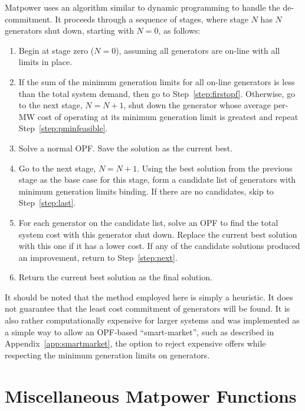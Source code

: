 \documentclass[12pt]{article}
\newcommand{\matpower}[0]{{\sc Matpower}}
\numberwithin{equation}{section}
\numberwithin{table}{section}
\numberwithin{figure}{section}
\begin{document}
\matpower{} uses an algorithm similar to dynamic programming to handle the de-commitment. It proceeds through a sequence of stages, where stage $N$ has $N$ generators shut down, starting with $N = 0$, as follows:
\begin{enumerate} %
\item Begin at stage zero ($N = 0$), assuming all generators are on-line with all limits in place.

\item If the sum of the minimum generation limits for all on-line generators is less than the total system demand, then go to Step~\ref{step:firstopf}. Otherwise, go to the next stage, $N = N + 1$, shut down the generator whose average per-MW cost of operating at its minimum generation limit is greatest and repeat Step~\ref{step:pminfeasible}.\label{step:pminfeasible}

\item Solve a normal OPF. Save the solution as the current best.\label{step:firstopf}

\item Go to the next stage, $N = N + 1$. Using the best solution from the previous stage as the base case for this stage, form a candidate list of generators with minimum generation limits binding.
If there are no candidates, skip to Step~\ref{step:last}.\label{step:next}

\item For each generator on the candidate list, solve an OPF to find the total system cost with this generator shut down. Replace the current best solution with this one if it has a lower cost.
If any of the candidate solutions produced an improvement, return to Step~\ref{step:next}.

\item Return the current best solution as the final solution. \label{step:last}
\end{enumerate}

It should be noted that the method employed here is simply a heuristic. It does not guarantee that the least cost commitment of generators will be found. It is also rather computationally expensive for larger systems and was implemented as a simple way to allow an OPF-based ``smart-market'', such as described in Appendix~\ref{app:smartmarket}, the option to reject expensive offers while respecting the minimum generation limits on generators.


\clearpage
\section{Miscellaneous \matpower{} Functions}
\label{sec:miscfunctions}
\end{document}
